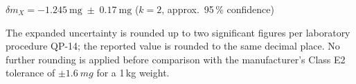 \begin{keybox}
\begin{center}
  \Large $\delta m_X = -1.245\ \text{mg} \;\pm\; 0.17\ \text{mg}$ \quad ($k = 2$, approx.\ 95\,\% confidence)
\end{center}
\end{keybox}

\begin{notebox}
The expanded uncertainty is rounded up to two significant figures per
laboratory procedure QP-14; the reported value is rounded to the same
decimal place. No further rounding is applied before comparison with the
manufacturer's Class E2 tolerance of $\pm\SI{1.6}{mg}$ for a 1\,kg weight.
\end{notebox}
